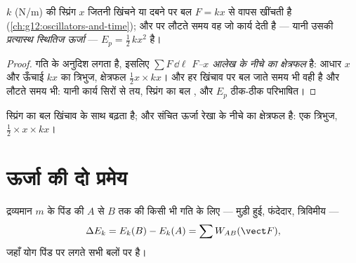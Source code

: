 \begin{proposition}[प्रत्यास्थ स्थितिज ऊर्जा]\label{prop:g12:work-and-energy:elastic}
 $k$ (\unit{N/m}) की स्प्रिंग $x$ जितनी खिंचने या दबने पर
बल $F = kx$ से वापस खींचती है (\cref{ch:g12:oscillators-and-time}); और  पर लौटते समय वह जो
कार्य देती है --- यानी उसकी \emph{प्रत्यास्थ स्थितिज
ऊर्जा} --- $E_p = \tfrac12\, k x^2$ है।
\end{proposition}

\begin{proof}
 गति के अनुदिश लगता है, इसलिए $\sum F\,\dd\ell$ \emph{$F$--$x$
आलेख के नीचे का क्षेत्रफल} है: आधार $x$ और ऊँचाई $kx$ का त्रिभुज,
क्षेत्रफल $\tfrac12 x \times kx$। और हर खिंचाव पर बल जाते समय भी वही है और लौटते समय
भी: यानी कार्य सिरों से तय, स्प्रिंग का बल , और
$E_p$ ठीक-ठीक परिभाषित।
\end{proof}

\begin{omfigure}

{\small स्प्रिंग का बल खिंचाव के साथ बढ़ता है; और संचित ऊर्जा
रेखा के नीचे का क्षेत्रफल है: एक त्रिभुज, $\tfrac12 \times x \times kx$।}
\end{omfigure}

\section{ऊर्जा की दो प्रमेय}

\begin{theorem}[गतिज-ऊर्जा प्रमेय]\label{thm:g12:work-and-energy:ketheorem}
द्रव्यमान $m$ के पिंड की $A$ से $B$ तक की किसी भी गति के लिए ---
मुड़ी हुई, फंदेदार, त्रिविमीय ---
\[
\Delta E_k = E_k(B) - E_k(A) = \sum W_{AB}(\vect F),
\]
जहाँ योग पिंड पर लगते सभी बलों पर है।
\end{theorem}

